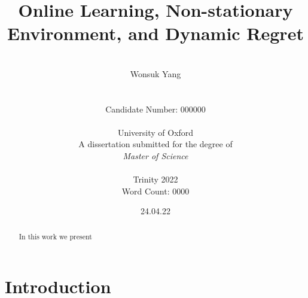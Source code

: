 \documentclass[12pt, a4paper]{report}
\date{24.04.22}
\title{Online Learning, Non-stationary Environment, and Dynamic Regret}
\author{\\ \Large{Wonsuk Yang}
\\
\\
\\ Candidate Number: 000000
\\
\\ University of Oxford
\\
A dissertation submitted for the degree of \\ \textit{Master of Science}
\\ \\
Trinity 2022
\\ \small{Word Count: 0000}
}
\begin{document}
\thispagestyle{headings}
	\maketitle
\FloatBarrier
{}

\thispagestyle{empty}
%
%
\begin{abstract}
In this work we present 
\end{abstract}
\tableofcontents


\chapter{Introduction}


\end{document}
